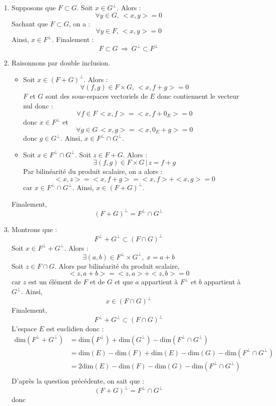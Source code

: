 \documentclass[a4paper,10pt]{report}
\begin{document}
\begin{enumerate}
\item Supposons que $F\subset G$. Soit $x \in G^{\perp}$. Alors :
$$ \forall y \in G, \, <x,y>=0$$
Sachant que $F \subset G$, on a :
$$ \forall y \in F, \, <x,y>=0$$
Ainsi, $x \in F^{\perp}$. Finalement :
$$F\subset G \ \Longrightarrow \ G^{\perp}\subset F^{\perp}$$
\item Raisonnons par double inclusion.
\begin{itemize}
\item Soit $x \in (F+G)^{\perp}$. Alors :
$$ \forall (f,g) \in F \times G, \, <x,f+g>=0$$
$F$ et $G$ sont des sous-espaces vectoriels de $E$ donc contiennent le vecteur nul donc :
$$ \forall f \in F  \, <x,f>=<x,f+0_E>=0$$
donc $x \in F^{\perp}$ et 
$$ \forall g \in G  \, <x,g>=<x,0_E+g>=0$$
donc $g \in G^{\perp}$. Ainsi, $x \in F^{\perp}\cap G^{\perp}$.
\item Soit $x \in F^{\perp}\cap G^{\perp}$. Soit $z \in F+G$. Alors :
$$ \exists (f,g) \in F \times G \, \vert \, z=f+g$$
Par bilinéarité du produit scalaire, on a alors :
$$ <x,z>=<x,f+g> = <x,f>+<x,g> = 0$$
car $x \in F^{\perp}\cap G^{\perp}$. Ainsi, $x \in (F+G)^{\perp}$.
\end{itemize}
Finalement,
$$(F+G)^{\perp}=F^{\perp}\cap G^{\perp}$$
\item Montrons que :
$$ F^{\perp}+G^{\perp} \subset (F\cap G)^{\perp}$$
Soit $x \in F^{\perp}+G^{\perp}$. Alors :
$$ \exists (a,b) \in F^{\perp} \times G^{\perp}, \; x=a+b$$
Soit $z \in F \cap G$. Alors par bilinéarité du produit scalaire,
$$ <z,a+b>=<z,a>+<z,b>=0$$
car $z$ est un élément de $F$ et de $G$ et que $a$ appartient à $F^{\perp}$ et $b$ appartient à $G^{\perp}$. Ainsi,
$$ x \in (F\cap G)^{\perp}$$
Finalement,
$$ F^{\perp}+G^{\perp} \subset (F\cap G)^{\perp}$$
L'espace $E$ est euclidien donc :
\begin{align*}
 \textrm{dim}(F^{\perp}+G^{\perp}) & =  \textrm{dim}(F^{\perp}) +  \textrm{dim}(G^{\perp}) -  \textrm{dim}(F^{\perp} \cap G^{\perp}) \\
 & = \textrm{dim}(E) - \textrm{dim}(F) + \textrm{dim}(E)- \textrm{dim}(G) - \textrm{dim}(F^{\perp} \cap G^{\perp}) \\ 
 & = 2 \textrm{dim}(E) - \textrm{dim}(F) - \textrm{dim}(G) - \textrm{dim}(F^{\perp} \cap G^{\perp})\\
\end{align*}
D'après la question précédente, on sait que :
$$ (F+G)^{\perp}=F^{\perp}\cap G^{\perp}$$ 
donc 
 \begin{align*}

\end{align*}
\end{enumerate}
\end{document}
